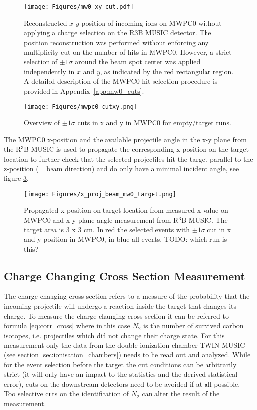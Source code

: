 \begin{enumerate}
\begin{figure}
\centering
\texttt{[image: Figures/mw0\_xy\_cut.pdf]}
\caption{Reconstructed \(x\)-\(y\) position of incoming ions on MWPC0 without applying a charge selection on the R3B MUSIC detector. The position reconstruction was performed without enforcing any multiplicity cut on the number of hits in MWPC0. However, a strict selection of \(\pm1\sigma\) around the beam spot center was applied independently in \(x\) and \(y\), as indicated by the red rectangular region. A detailed description of the MWPC0 hit selection procedure is provided in Appendix~\ref{app:mw0_cuts}.}
\label{fig:mw0_xy_overview}
\end{figure}
\begin{figure}
\centering
\texttt{[image: Figures/mwpc0\_cutxy.png]}
\caption{Overview of $\pm 1\sigma$ cuts in x and y in MWPC0 for empty/target runs.}
\label{fig:mw0_cuts}
\end{figure}
The MWPC0 x-position and the available projectile angle in the x-y plane from the R$^3$B MUSIC is used to propagate the corresponding x-position on the target location to further check that the selected projectiles hit the target parallel to the z-position (= beam direction) and do only have a minimal incident angle, see figure \ref{fig:x_pos_target}. 
\begin{figure}[htpb]
    \centering
    \texttt{[image: Figures/x\_proj\_beam\_mw0\_target.png]}
    \caption{
   	Propagated x-position on target location from measured x-value on MWPC0 and x-y plane angle measurement from R$^3$B MUSIC. The target area is 3 x 3 cm. In red the selected events with $\pm 1\sigma$ cut in x and y position in MWPC0, in blue all events. TODO: which run is this?
    }
    \label{fig:x_pos_target}
\end{figure}
\end{enumerate}
\subsection{Charge Changing Cross Section Measurement}\label{subsec:cc_cs}
The charge changing cross section refers to a measure of the probability that the incoming projectile will undergo a reaction inside the target that changes its charge. To measure the charge changing cross section it can be referred to formula \ref{eq:corr_cross} where in this case $N_2$ is the number of survived carbon isotopes, i.e. projectiles which did not change their charge state. For this measurement only the data from the double ionization chamber TWIN MUSIC (see section \ref{sec:ionisation_chambers}) needs to be read out and analyzed.\newline
While for the event selection before the target the cut conditions can be arbitrarily strict (it will only have an impact to the statistics and the derived statistical error), cuts on the downstream detectors need to be avoided if at all possible. Too selective cuts on the identification of $N_2$ can alter the result of the measurement.
